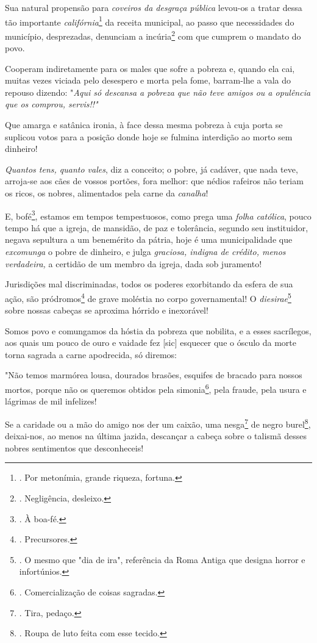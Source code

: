 Sua natural propensão para \emph{coveiros da desgraça pública} levou-os
a tratar dessa tão importante \emph{califórnia}\footnote{. Por
  metonímia, grande riqueza, fortuna.} da receita municipal, ao passo
que necessidades do município, desprezadas, denunciam a
incúria\footnote{. Negligência, desleixo.} com que cumprem o mandato do
povo.

Cooperam indiretamente para os males que sofre a pobreza e, quando ela
cai, muitas vezes viciada pelo desespero e morta pela fome, barram-lhe a
vala do repouso dizendo: "\emph{Aqui só descansa a pobreza que não teve
amigos ou a opulência que os comprou, servis!!"}

Que amarga e satânica ironia, à face dessa mesma pobreza à cuja porta se
suplicou votos para a posição donde hoje se fulmina interdição ao morto
sem dinheiro!

\emph{Quantos tens, quanto vales}, diz a conceito; o pobre, já cadáver,
que nada teve, arroja-se aos cães de vossos portões, fora melhor: que
nédios rafeiros não teriam os ricos, os nobres, alimentados pela carne
da \emph{canalha}!

E, bofé\footnote{. À boa-fé.}, estamos em tempos tempestuosos, como
prega uma \emph{folha católica}, pouco tempo há que a igreja, de
mansidão, de paz e tolerância, segundo seu instituidor, negava sepultura
a um benemérito da pátria, hoje é uma municipalidade que
\emph{excomunga} o pobre de dinheiro, e julga \emph{graciosa, indigna de
crédito, menos verdadeira,} a certidão de um membro da igreja, dada sob
juramento!

Jurisdições mal discriminadas, todos os poderes exorbitando da esfera de
sua ação, são pródromos\footnote{. Precursores.} de grave moléstia no
corpo governamental! O \emph{diesirae}\footnote{. O mesmo que "dia de
  ira", referência da Roma Antiga que designa horror e infortúnios.}
sobre nossas cabeças se aproxima hórrido e inexorável!

Somos povo e comungamos da hóstia da pobreza que nobilita, e a esses
sacrílegos, aos quais um pouco de ouro e vaidade fez {[}sic{]} esquecer
que o ósculo da morte torna sagrada a carne apodrecida, só diremos:

"Não temos marmórea lousa, dourados brasões, esquifes de bracado para
nossos mortos, porque não os queremos obtidos pela simonia\footnote{.
  Comercialização de coisas sagradas.}, pela fraude, pela usura e
lágrimas de mil infelizes!

Se a caridade ou a mão do amigo nos der um caixão, uma nesga\footnote{.
  Tira, pedaço.} de negro burel\footnote{. Roupa de luto feita com esse
  tecido.}, deixai-nos, ao menos na última jazida, descançar a cabeça
sobre o talismã desses nobres sentimentos que desconheceis!

